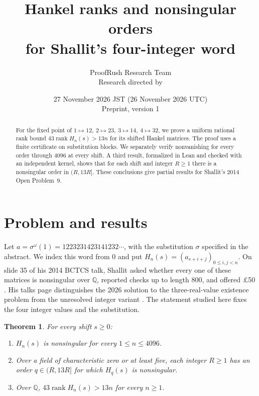 \documentclass[10pt]{article}
\title{Hankel ranks and nonsingular orders\\ for Shallit's four-integer word}
\author{ProofRush Research Team\\\small Research directed by \director}
\date{27 November 2026 JST (26 November 2026 UTC)\\\small Preprint, version 1}
\newcommand{\rank}{\operatorname{rank}}
\newtheorem{theorem}{Theorem}
\begin{document}
\maketitle
\begin{abstract}
For the fixed point of \(1\mapsto12,\ 2\mapsto23,\ 3\mapsto14,\ 4\mapsto32\), we prove a uniform rational rank bound \(43\operatorname{rank}H_n(s)>13n\) for its shifted Hankel matrices. The proof uses a finite certificate on substitution blocks. We separately verify nonvanishing for every order through \(4096\) at every shift. A third result, formalized in Lean and checked with an independent kernel, shows that for each shift and integer \(R\ge1\) there is a nonsingular order in \((R,13R]\). These conclusions give partial results for Shallit's 2014 Open Problem~9.
\end{abstract}

\section{Problem and results}
Let \(a=\sigma^\omega(1)=1223231423141232\cdots\), with the substitution \(\sigma\) specified in the abstract. We index this word from \(0\) and put \(H_n(s)=(a_{s+i+j})_{0\le i,j<n}\). On slide 35 of his 2014 BCTCS talk, Shallit asked whether every one of these matrices is nonsingular over \(\mathbb Q\), reported checks up to length \(800\), and offered \pounds50 \cite{shallit}. His talks page distinguishes the 2026 solution to the three-real-value existence problem from the unresolved integer variant \cite{update,cavalcante}. The statement studied here fixes the four integer values and the substitution.

\begin{theorem}\label{main}
For every shift \(s\ge0\):
\begin{enumerate}
\item \(H_n(s)\) is nonsingular for every \(1\le n\le4096\).
\item Over a field of characteristic zero or at least five, each integer \(R\ge1\) has an order \(q\in(R,13R]\) for which \(H_q(s)\) is nonsingular.
\item Over \(\mathbb Q\), \(43\rank H_n(s)>13n\) for every \(n\ge1\).
\end{enumerate}
\end{theorem}
\end{document}
